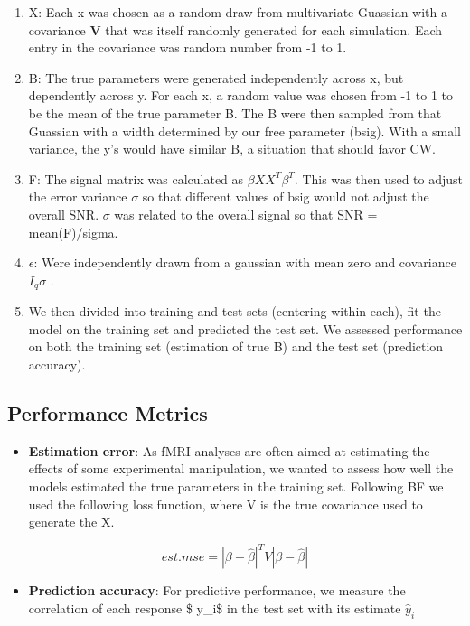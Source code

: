 \documentclass{article}
\begin{document}
\begin{enumerate}
\def\labelenumi{\arabic{enumi}.}
\item
  X: Each x was chosen as a random draw from multivariate Guassian with
  a covariance $ \textbf{V} $ that was itself randomly generated for
  each simulation. Each entry in the covariance was random number from
  -1 to 1.
\item
  B: The true parameters were generated independently across x, but
  dependently across y. For each x, a random value was chosen from -1 to
  1 to be the mean of the true parameter B. The B were then sampled from
  that Guassian with a width determined by our free parameter (bsig).
  With a small variance, the y's would have similar B, a situation that
  should favor CW.
\item
  F: The signal matrix was calculated as $ \beta XX^{T} \beta^{T} $.
  This was then used to adjust the error variance \(\sigma\) so that
  different values of bsig would not adjust the overall SNR. $
  \sigma $ was related to the overall signal so that SNR =
  mean(F)/sigma.
\item
  $ \epsilon $: Were independently drawn from a gaussian with mean
  zero and covariance $ I_q \sigma $ .
\item
  We then divided into training and test sets (centering within each),
  fit the model on the training set and predicted the test set. We
  assessed performance on both the training set (estimation of true B)
  and the test set (prediction accuracy).
\end{enumerate}

\subsection{Performance Metrics}\label{performance-metrics}

\begin{itemize}
\itemsep1pt\parskip0pt
\item
  \textbf{Estimation error}: As fMRI analyses are often aimed at
  estimating the effects of some experimental manipulation, we wanted to
  assess how well the models estimated the true parameters in the
  training set. Following BF we used the following loss function, where
  V is the true covariance used to generate the X.
\end{itemize}

\[ est.mse = |\beta-\hat \beta|^T V |\beta - \hat \beta| \]

\begin{itemize}
\itemsep1pt\parskip0pt
\item
  \textbf{Prediction accuracy}: For predictive performance, we measure
  the correlation of each response \$ y\_i\$ in the test set with its
  estimate \(\hat y_i\)
\end{itemize}
\end{document}
